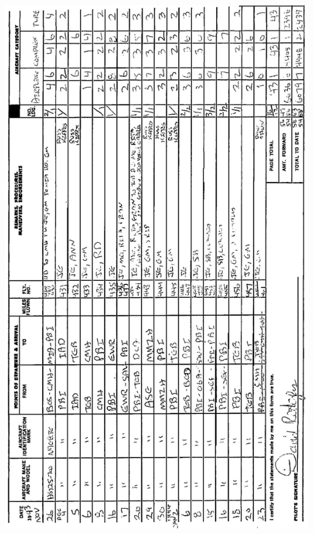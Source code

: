 \documentclass[10pt]{article}
\begin{document}
\includegraphics[max width=\textwidth, center]{2025_02_27_dd68c3d38de88f0516d9g-029}\\
\end{document}
